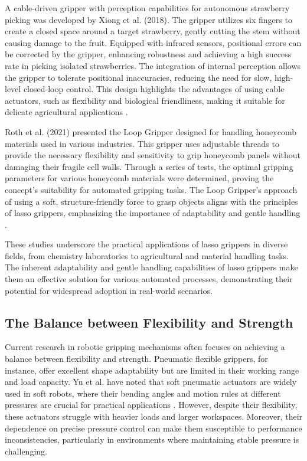 A cable-driven gripper with perception capabilities for autonomous strawberry picking was developed by Xiong et al. (2018). The gripper utilizes six fingers to create a closed space around a target strawberry, gently cutting the stem without causing damage to the fruit. Equipped with infrared sensors, positional errors can be corrected by the gripper, enhancing robustness and achieving a high success rate in picking isolated strawberries. The integration of internal perception allows the gripper to tolerate positional inaccuracies, reducing the need for slow, high-level closed-loop control. This design highlights the advantages of using cable actuators, such as flexibility and biological friendliness, making it suitable for delicate agricultural applications \cite{xiong2018design}.

Roth et al. (2021) presented the Loop Gripper designed for handling honeycomb materials used in various industries. This gripper uses adjustable threads to provide the necessary flexibility and sensitivity to grip honeycomb panels without damaging their fragile cell walls. Through a series of tests, the optimal gripping parameters for various honeycomb materials were determined, proving the concept's suitability for automated gripping tasks. The Loop Gripper's approach of using a soft, structure-friendly force to grasp objects aligns with the principles of lasso grippers, emphasizing the importance of adaptability and gentle handling \cite{roth2021loop}.

These studies underscore the practical applications of lasso grippers in diverse fields, from chemistry laboratories to agricultural and material handling tasks. The inherent adaptability and gentle handling capabilities of lasso grippers make them an effective solution for various automated processes, demonstrating their potential for widespread adoption in real-world scenarios.




\subsection{The Balance between Flexibility and Strength}

Current research in robotic gripping mechanisms often focuses on achieving a balance between flexibility and strength. Pneumatic flexible grippers, for instance, offer excellent shape adaptability but are limited in their working range and load capacity. Yu et al. have noted that soft pneumatic actuators are widely used in soft robots, where their bending angles and motion rules at different pressures are crucial for practical applications \cite{yu2022modeling}. However, despite their flexibility, these actuators struggle with heavier loads and larger workspaces. Moreover, their dependence on precise pressure control can make them susceptible to performance inconsistencies, particularly in environments where maintaining stable pressure is challenging.


